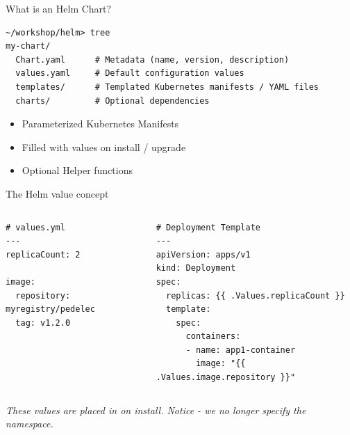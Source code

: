 \begin{frame}[fragile]{What is an Helm Chart?}
  \begin{termbox}
\begin{lstlisting}[style=wstermstyle]
~/workshop/helm> tree
my-chart/
  Chart.yaml      # Metadata (name, version, description)
  values.yaml     # Default configuration values
  templates/      # Templated Kubernetes manifests / YAML files
  charts/         # Optional dependencies
\end{lstlisting}
  \end{termbox}
  \begin{itemize}
    \item Parameterized Kubernetes Manifests
    \item Filled with values on install / upgrade
    \item Optional Helper functions
  \end{itemize}
\end{frame}

\begin{frame}[fragile]{The Helm value concept}
  \begin{columns}[T]
      \begin{yamlbox}
\begin{lstlisting}[style=wsyamlstyle, basicstyle=\ttfamily\scriptsize]
# values.yml
---
replicaCount: 2

image:
  repository: myregistry/pedelec
  tag: v1.2.0
\end{lstlisting}
      \end{yamlbox}
      \begin{yamlbox}
\begin{lstlisting}[style=wsyamlstyle, basicstyle=\ttfamily\scriptsize]
# Deployment Template
---
apiVersion: apps/v1
kind: Deployment
spec:
  replicas: {{ .Values.replicaCount }}
  template:
    spec:
      containers:
      - name: app1-container
        image: "{{ .Values.image.repository }}"
\end{lstlisting}
      \end{yamlbox}
  \end{columns}
  \smallskip
  \emph{These values are placed in on install. Notice - we no longer specify the namespace.}
\end{frame}

